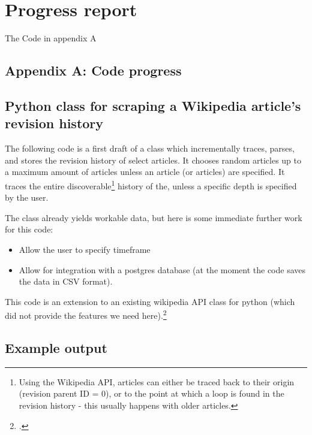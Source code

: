 \documentclass[a4paper,11pt,twoside,notitlepage]{article}
\renewcommand{\cite}[1]{\footcite{#1}}
\begin{document}
        \section{Progress report}
        
        The Code in appendix A


\clearpage
\printbibheading[heading=bibintoc,title={References}]
\printbibliography[keyword=wiki,heading=subbibliography,title={Wikipedia}]
\printbibliography[keyword=edit,heading=subbibliography,title={Edit
distance}]

        
\clearpage
\begin{appendices}
\section{Appendix A: Code progress}
\subsection{Python class for scraping a Wikipedia article's revision history}
The following code is a first draft of a class which incrementally
traces, parses, and stores the revision history of select articles. It
chooses random articles up to a maximum amount of articles unless an
article (or articles) are specified. It traces the entire
discoverable\footnote{Using the Wikipedia API, articles can either be
  traced back to their origin (revision parent ID = 0), or to the
  point at which a loop is found in the revision history - this
  usually happens with older articles.} history of the, unless a
specific depth is specified by the user.

The class already yields workable data, but here is some immediate
further work for this code:
\begin{itemize}
  \item Allow the user to specify timeframe
  \item Allow for integration with a postgres database (at the moment
    the code saves the data in CSV format).
\end{itemize}

This code is an extension to an existing wikipedia API class for
python (which did not provide the features we need
here).\cite{python-wikipedia}


\subsection{Example output}


\end{appendices}
\end{document}
